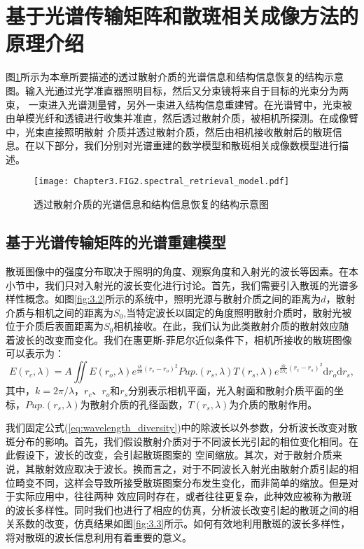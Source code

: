 \section{基于光谱传输矩阵和散斑相关成像方法的原理介绍}
图\ref{fig:3.1}所示为本章所要描述的透过散射介质的光谱信息和结构信息恢复的结构示意图。输入光通过光学准直器照明目标，然后又分束镜将来自于目标的光束分为两束，
一束进入光谱测量臂，另外一束进入结构信息重建臂。在光谱臂中，光束被由单模光纤和透镜进行收集并准直，然后透过散射介质，被相机所探测。在成像臂中，光束直接照明散射
介质并透过散射介质，然后由相机接收散射后的散斑信息。在以下部分，我们分别对光谱重建的数学模型和散斑相关成像数模型进行描述。
\begin{figure}[htp]
	\centering
	\texttt{[image: Chapter3.FIG2.spectral\_retrieval\_model.pdf]}
	\caption{透过散射介质的光谱信息和结构信息恢复的结构示意图}
	\label{fig:3.1}
\end{figure}

\subsection{基于光谱传输矩阵的光谱重建模型}
散斑图像中的强度分布取决于照明的角度、观察角度和入射光的波长等因素。在本小节中，我们只对入射光的波长变化进行讨论。首先，我们需要引入散斑的光谱多样性概念。如图\ref{fig:3.2}所示的系统中，照明光源与散射介质之间的距离为$d$，散射介质与相机之间的距离为$S_{0}$,当特定波长以固定的角度照明散射介质时，散射光被位于介质后表面距离为$S_{0}$相机接收。在此，我们认为此类散射介质的散射效应随着波长的改变而变化。我们在惠更斯-菲尼尔近似条件下，相机所接收的散斑图像可以表示为：
\begin{equation}
    E(r_{c},\lambda) = A\iint E(r_{o},\lambda)e^{\frac{ik}{2d}(r_{s}-r_{o})^{2}}Pup.(r_{s},\lambda)T(r_{s},\lambda)e^{\frac{ik}{2S_{o}}(r_{c}-r_{s})^{2}}\mathrm{d}{r_{o}}\mathrm{d}{r_{s}}
\label{eq:wavelength_diversity},
\end{equation}
其中，$k =2\pi/\lambda$，$r_{c}$、$r_{o}$和$r_{s}$分别表示相机平面，光入射面和散射介质平面的坐标，$Pup.(r_{s},\lambda)$为散射介质的孔径函数，$T(r_{s},\lambda)$为介质的散射作用。

我们固定公式(\ref{eq:wavelength_diversity})中的除波长以外参数，分析波长改变对散斑分布的影响。首先，我们假设散射介质对于不同波长光引起的相位变化相同。在此假设下，波长的改变，会引起散斑图案的
空间缩放。其次，对于散射介质来说，其散射效应取决于波长。换而言之，对于不同波长入射光由散射介质引起的相位畸变不同，这样会导致所接受散斑图案分布发生变化，而非简单的缩放。但是对于实际应用中，往往两种
效应同时存在，或者往往更复杂，此种效应被称为散斑的波长多样性。同时我们也进行了相应的仿真，分析波长改变引起的散斑之间的相关系数的改变，仿真结果如图\ref{fig:3.3}所示。如何有效地利用散斑的波长多样性，将对散斑的波长信息利用有着重要的意义。

